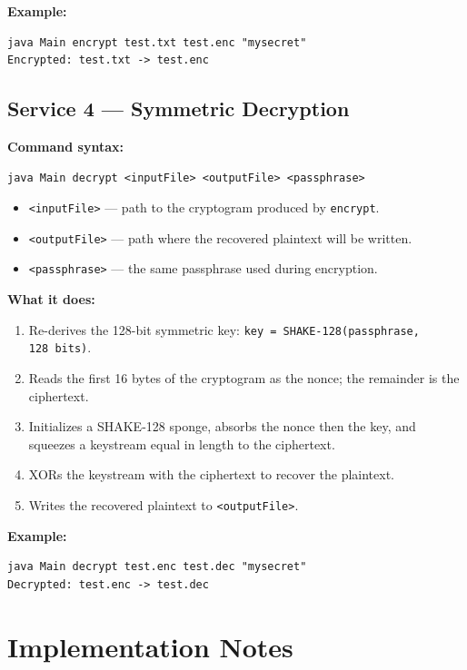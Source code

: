 \documentclass[11pt]{article}
\begin{document}
\textbf{Example:}
\begin{lstlisting}
java Main encrypt test.txt test.enc "mysecret"
Encrypted: test.txt -> test.enc
\end{lstlisting}

\subsection{Service 4 --- Symmetric Decryption}

\textbf{Command syntax:}
\begin{lstlisting}
java Main decrypt <inputFile> <outputFile> <passphrase>
\end{lstlisting}

\begin{itemize}[noitemsep]
  \item \texttt{<inputFile>} --- path to the cryptogram produced by
        \texttt{encrypt}.
  \item \texttt{<outputFile>} --- path where the recovered plaintext will be
        written.
  \item \texttt{<passphrase>} --- the same passphrase used during encryption.
\end{itemize}

\textbf{What it does:}
\begin{enumerate}[noitemsep]
  \item Re-derives the 128-bit symmetric key:
        \texttt{key = SHAKE-128(passphrase, 128~bits)}.
  \item Reads the first 16 bytes of the cryptogram as the nonce; the remainder
        is the ciphertext.
  \item Initializes a SHAKE-128 sponge, absorbs the nonce then the key, and
        squeezes a keystream equal in length to the ciphertext.
  \item XORs the keystream with the ciphertext to recover the plaintext.
  \item Writes the recovered plaintext to \texttt{<outputFile>}.
\end{enumerate}

\textbf{Example:}
\begin{lstlisting}
java Main decrypt test.enc test.dec "mysecret"
Decrypted: test.enc -> test.dec
\end{lstlisting}

\section{Implementation Notes}
\end{document}
